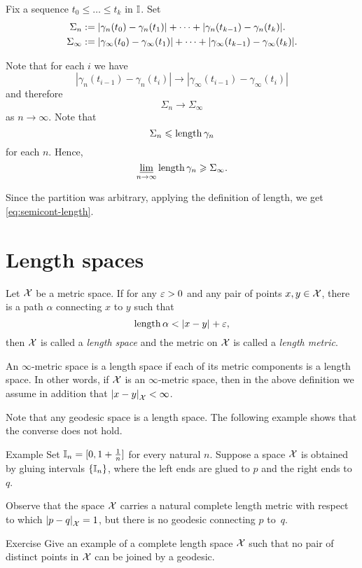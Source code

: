 Fix a sequence $t_0\le\dots\le t_k$ in $\mathbb{I}$.
Set 
\begin{align*}\Sigma_n
&\mathrel{:=}
|\gamma_n(t_0)-\gamma_n(t_1)|+\dots+|\gamma_n(t_{k-1})-\gamma_n(t_k)|.
\\
\Sigma_\infty
&\mathrel{:=}
|\gamma_\infty(t_0)-\gamma_\infty(t_1)|+\dots+|\gamma_\infty(t_{k-1})-\gamma_\infty(t_k)|.
\end{align*}

Note that for each $i$ we have 
\[|\gamma_n(t_{i-1})-\gamma_n(t_i)|\to|\gamma_\infty(t_{i-1})-\gamma_\infty(t_i)|\]
and therefore
\[\Sigma_n\to \Sigma_\infty\] 
as $n\to\infty$.
Note that 
\[\Sigma_n\leqslant\mathop{\rm length}\nolimits\gamma_n\]
for each $n$.
Hence,
$$\varliminf_{n\to\infty} \mathop{\rm length}\nolimits\gamma_n \geqslant \Sigma_\infty.$$

Since the partition was arbitrary, applying the definition of length, we get \ref{eq:semicont-length}.
\qeds

\section{Length spaces}\label{sec:intrinsic}

Let $\mathcal{X}$ be a metric space.
If for any $\varepsilon>0$ and any pair of points $x,y\in\mathcal{X}$, there is a path $\alpha$ connecting $x$ to $y$ such that
\[\length\alpha< \dist{x}{y}{}+\eps,\]
then $\mathcal{X}$ is called a \emph{length space} and the metric on $\mathcal{X}$ is called a \emph{length metric}.\label{page:length metric}

An $\infty$-metric space is a length space if each of its metric components is a length space.
In other words, if $\mathcal{X}$ is an $\infty$-metric space, then in the above definition we assume in addition that $\dist{x}{y}{\spc{X}}<\infty$.

Note that any geodesic space is a length space.
The following example shows that the converse does not hold.


\begin{thm}{Example}
Set $\mathbb{I}_n=[0,1+\tfrac1n]$ for every natural $n$.
Suppose a space $\mathcal{X}$ is obtained by gluing intervals $\{\mathbb{I}_n\}$, where the left ends are glued to $p$ and the right ends to~$q$.

Observe that the space $\mathcal{X}$ carries a natural complete length metric with respect to which $\dist{p}{q}{\spc{X}}=1$, but there is no geodesic connecting $p$ to~$q$.
\end{thm}

\begin{thm}{Exercise}\label{ex:no-geod}
Give an example of a complete length space $\mathcal{X}$ such that no pair of distinct points in $\mathcal{X}$ can be joined by a geodesic.
\end{thm}

